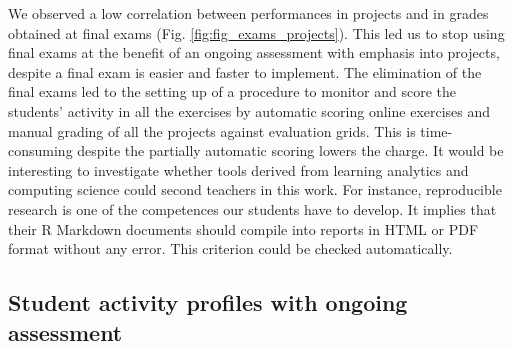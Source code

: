 \documentclass{aims}
\theoremstyle{definition}
\begin{document}
We observed a low correlation between performances in projects and in
grades obtained at final exams (Fig. \ref {fig:fig_exams_projects}).
This led us to stop using final exams at the benefit of an ongoing
assessment with emphasis into projects, despite a final exam is easier
and faster to implement. The elimination of the final exams led to the
setting up of a procedure to monitor and score the students' activity in
all the exercises by automatic scoring online exercises and manual
grading of all the projects against evaluation grids. This is
time-consuming despite the partially automatic scoring lowers the
charge. It would be interesting to investigate whether tools derived
from learning analytics and computing science could second teachers in
this work. For instance, reproducible research is one of the competences
our students have to develop. It implies that their R Markdown documents
should compile into reports in HTML or PDF format without any error.
This criterion could be checked automatically.

\hypertarget{student-activity-profiles-with-ongoing-assessment}{%
\subsection{Student activity profiles with ongoing
assessment}\label{student-activity-profiles-with-ongoing-assessment}}
\end{document}
